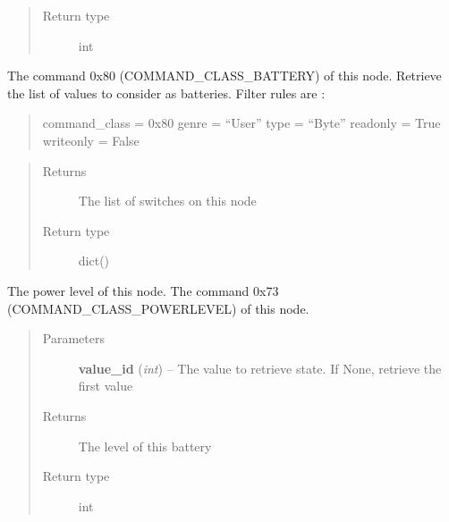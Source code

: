 \documentclass[letterpaper,10pt,english]{sphinxmanual}
\begin{document}
\begin{fulllineitems}
\begin{fulllineitems}
\begin{quote}
\begin{description}
\item[{Return type}] \leavevmode
int

\end{description}\end{quote}

\end{fulllineitems}


\begin{fulllineitems}
\label{command:openzwave.command.ZWaveNodeBasic.get_battery_levels}
The command 0x80 (COMMAND\_CLASS\_BATTERY) of this node.
Retrieve the list of values to consider as batteries.
Filter rules are :
\begin{quote}

command\_class = 0x80
genre = ``User''
type = ``Byte''
readonly = True
writeonly = False
\end{quote}
\begin{quote}\begin{description}
\item[{Returns}] \leavevmode
The list of switches on this node

\item[{Return type}] \leavevmode
dict()

\end{description}\end{quote}

\end{fulllineitems}


\begin{fulllineitems}
\label{command:openzwave.command.ZWaveNodeBasic.get_power_level}
The power level of this node.
The command 0x73 (COMMAND\_CLASS\_POWERLEVEL) of this node.
\begin{quote}\begin{description}
\item[{Parameters}] \leavevmode
\textbf{value\_id} (\emph{int}) -- The value to retrieve state. If None, retrieve the first value

\item[{Returns}] \leavevmode
The level of this battery

\item[{Return type}] \leavevmode
int


\end{description}
\end{quote}
\end{fulllineitems}
\end{fulllineitems}
\end{document}
